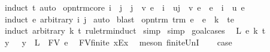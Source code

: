 \begin{isabellebody}
%
\isadelimproof
%
\endisadelimproof
%
\isatagproof
{}\isamarkupfalse%
\ {\isacharparenleft}induct\ t{\isacharcomma}\ auto{\isacharparenright}%
\endisatagproof
{\isafoldproof}%
%
\isadelimproof
\isanewline
%
\endisadelimproof
\isanewline
{}\isamarkupfalse%
\ opn{\isacharunderscore}trm{\isacharunderscore}core{\isacharcolon}\ {\isachardoublequoteopen}i\ {\isasymnoteq}\ j\ {\isasymLongrightarrow}\ {\isacharbraceleft}j\ {\isasymrightarrow}\ v{\isacharbraceright}\ e\ {\isacharequal}\ {\isacharbraceleft}i\ {\isasymrightarrow}\ u{\isacharbraceright}{\isacharparenleft}{\isacharbraceleft}j\ {\isasymrightarrow}\ v{\isacharbraceright}\ e{\isacharparenright}\ {\isasymLongrightarrow}\ e\ {\isacharequal}\ {\isacharbraceleft}i\ {\isasymrightarrow}\ u{\isacharbraceright}\ e{\isachardoublequoteclose}\isanewline
%
\isadelimproof
%
\endisadelimproof
%
\isatagproof
{}\isamarkupfalse%
\ {\isacharparenleft}induct\ e\ arbitrary{\isacharcolon}\ i\ j{\isacharparenright}\isanewline
{}\isamarkupfalse%
\ auto\isanewline
{}\isamarkupfalse%
\ blast%
\endisatagproof
{\isafoldproof}%
%
\isadelimproof
\isanewline
%
\endisadelimproof
\isanewline
{}\isamarkupfalse%
\ opn{\isacharunderscore}trm{\isacharcolon}\ {\isachardoublequoteopen}trm\ e\ {\isasymLongrightarrow}\ e\ {\isacharequal}\ {\isacharbraceleft}k\ {\isasymrightarrow}\ t{\isacharbraceright}e{\isachardoublequoteclose}\isanewline
%
\isadelimproof
%
\endisadelimproof
%
\isatagproof
{}\isamarkupfalse%
\ {\isacharparenleft}induct\ arbitrary{\isacharcolon}\ k\ t\ rule{\isacharcolon}trm{\isachardot}induct{\isacharparenright}\isanewline
{}\isamarkupfalse%
\ simp{\isacharplus}\isanewline
{}\isamarkupfalse%
\isanewline
{}\isamarkupfalse%
\ simp\isanewline
{}\isamarkupfalse%
\ goal{\isacharunderscore}cases\isanewline
{}\isamarkupfalse%
\ {\isacharparenleft}{}\ L\ e\ k\ t{\isacharparenright}\isanewline
\ \ \isamarkupfalse%
\ \isamarkupfalse%
\ y\ \ {}{\isacharcolon}\ {\isachardoublequoteopen}y\ {\isasymnotin}\ {\isacharparenleft}L\ {\isasymunion}\ FV\ e{\isacharparenright}{\isachardoublequoteclose}\ \isamarkupfalse%
\ FV{\isacharunderscore}finite\ x{\isacharunderscore}Ex\ \isamarkupfalse%
\ {\isacharparenleft}meson\ finite{\isacharunderscore}UnI{\isacharparenright}\isanewline
\ \ \isamarkupfalse%
\ {\isacharquery}case\isanewline
\ \ \isamarkupfalse%

\end{isabellebody}
